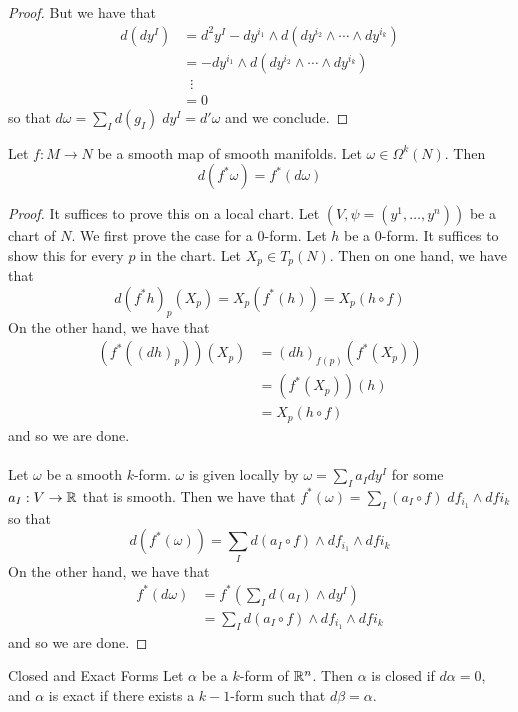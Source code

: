 \documentclass[a4paper]{article}
\begin{document}
\begin{thm}{}{}
\begin{proof}
But we have that 
\begin{align*}
d(dy^I)&=d^2y^I-dy^{i_1}\wedge d(dy^{i_2}\wedge\cdots\wedge dy^{i_k})\\
&=-dy^{i_1}\wedge d(dy^{i_2}\wedge\cdots\wedge dy^{i_k})\\
&\;\;\vdots\\
&=0
\end{align*}
so that $d\omega=\sum_Id(g_I)\;dy^I=d'\omega$ and we conclude. 
\end{proof}
\end{thm}

\begin{prp}{}{} Let $f:M\to N$ be a smooth map of smooth manifolds. Let $\omega\in\Omega^k(N)$. Then $$d(f^\ast\omega)=f^\ast(d\omega)$$ \tcbline
\begin{proof}
It suffices to prove this on a local chart. Let $(V,\psi=(y^1,\dots,y^n))$ be a chart of $N$. We first prove the case for a $0$-form. Let $h$ be a $0$-form. It suffices to show this for every $p$ in the chart. Let $X_p\in T_p(N)$. Then on one hand, we have that $$d(f^\ast h)_p(X_p)=X_p(f^\ast(h))=X_p(h\circ f)$$ On the other hand, we have that 
\begin{align*}
(f^\ast((dh)_p))(X_p)&=(dh)_{f(p)}(f^\ast(X_p))\tag{Pull back of a one form}\\
&=(f^\ast(X_p))(h)\tag{Definition of the differntial}\\
&=X_p(h\circ f)\tag{Definition of $f^\ast$}
\end{align*} and so we are done. \\~\\

Let $\omega$ be a smooth $k$-form. $\omega$ is given locally by $\omega=\sum_Ia_Idy^I$ for some $a_I:V\to\mathbb{R}$ that is smooth. Then we have that $f^\ast(\omega)=\sum_I(a_I\circ f)\;df_{i_1}\wedge df{i_k}$ so that $$d(f^\ast(\omega))=\sum_Id(a_I\circ f)\wedge df_{i_1}\wedge df{i_k}$$ On the other hand, we have that 
\begin{align*}
f^\ast(d\omega)&=f^\ast\left(\sum_Id(a_I)\wedge dy^I\right)\\
&=\sum_Id(a_I\circ f)\wedge df_{i_1}\wedge df{i_k}
\end{align*}
and so we are done. 
\end{proof}
\end{prp}

\begin{defn}{Closed and Exact Forms}{} Let $\alpha$ be a $k$-form of $\mathbb{R}^n$. Then $\alpha$ is closed if $d\alpha=0$, and $\alpha$ is exact if there exists a $k-1$-form such that $d\beta=\alpha$. 
\end{defn}
\end{document}
